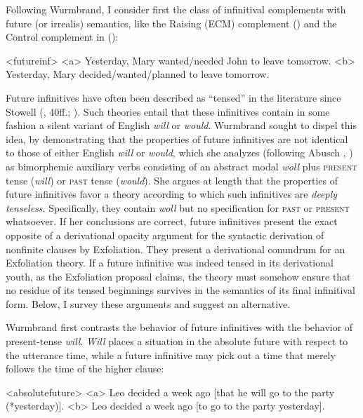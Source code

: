\documentclass[output=paper]{langscibook}
\begin{document}
Following Wurmbrand, I consider first the class of infinitival complements with future (or irrealis) semantics, like the Raising (ECM) complement () and the Control complement in ():

\pex<futureinf>
\a<a> Yesterday, Mary wanted/needed John to leave tomorrow.
\a<b> Yesterday, Mary decided/wanted/planned to leave tomorrow.
\xe

\noindent Future infinitives have often been described as “tensed” in the literature since Stowell (\citeyear{Stowell:1981}, 40ff.; \citeyear{Stowell1982b}). Such theories entail that these infinitives contain in some fashion a silent variant of English \textit{will }or \textit{would}. Wurmbrand sought to dispel this idea, by demonstrating that the properties of future infinitives are not identical to those of either English \textit{will} or \textit{would}, which she analyzes (following Abusch \citeyear{Abusch:1985tm}, \citeyear{Abusch1988}) as bimorphemic auxiliary verbs consisting of an abstract modal \textit{woll }plus \textsc{present }tense\textsc{ (}\textit{will})\textsc{ }or \textsc{past }tense (\textit{would})\textsc{.} She argues at length that the properties of future infinitives favor a theory according to which such infinitives are \textit{deeply tenseless}. Specifically, they contain \textit{woll} but no specification for \textsc{past }or \textsc{present }whatsoever.\textit{ }If her conclusions are correct, future infinitives present the exact opposite of a derivational opacity argument for the syntactic derivation of nonfinite clauses by Exfoliation. They present a derivational conundrum for an Exfoliation theory. If a future infinitive was indeed tensed in its derivational youth, as the Exfoliation proposal claims, the theory must somehow ensure that no residue of its tensed beginnings survives in the semantics of its final infinitival form. Below, I survey these arguments and suggest an alternative.

Wurmbrand first contrasts the behavior of future infinitives with the behavior of present-tense \textit{will}. \textit{Will} places a situation in the absolute future with respect to the utterance time, while a future infinitive may pick out a time that merely follows the time of the higher clause: 

\pex<absolutefuture>
\a<a> Leo decided a week ago [that he will go to the party (*yesterday)].
\a<b> Leo decided a week ago [to go to the party yesterday].
\xe
\end{document}
